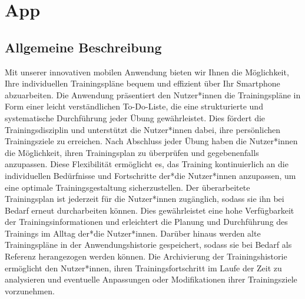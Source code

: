 \section{App}
\subsection{Allgemeine Beschreibung}
Mit unserer innovativen mobilen Anwendung bieten wir Ihnen die Möglichkeit, Ihre individuellen Trainingspläne bequem und effizient über Ihr Smartphone abzuarbeiten. Die Anwendung präsentiert den Nutzer*innen die Trainingspläne in Form einer leicht verständlichen To-Do-Liste, die eine strukturierte und systematische Durchführung jeder Übung gewährleistet. Dies fördert die Trainingsdisziplin und unterstützt die Nutzer*innen dabei, ihre persönlichen Trainingsziele zu erreichen.
\newline
\newline
Nach Abschluss jeder Übung haben die Nutzer*innen die Möglichkeit, ihren Trainingsplan zu überprüfen und gegebenenfalls anzupassen. Diese Flexibilität ermöglicht es, das Training kontinuierlich an die individuellen Bedürfnisse und Fortschritte der*die Nutzer*innen anzupassen, um eine optimale Trainingsgestaltung sicherzustellen.
\newline
\newline
Der überarbeitete Trainingsplan ist jederzeit für die Nutzer*innen zugänglich, sodass sie ihn bei Bedarf erneut durcharbeiten können. Dies gewährleistet eine hohe Verfügbarkeit der Trainingsinformationen und erleichtert die Planung und Durchführung des Trainings im Alltag der*die Nutzer*innen.
\newpage
Darüber hinaus werden alte Trainingspläne in der Anwendungshistorie gespeichert, sodass sie bei Bedarf als Referenz herangezogen werden können. Die Archivierung der Trainingshistorie ermöglicht den Nutzer*innen, ihren Trainingsfortschritt im Laufe der Zeit zu analysieren und eventuelle Anpassungen oder Modifikationen ihrer Trainingsziele vorzunehmen.